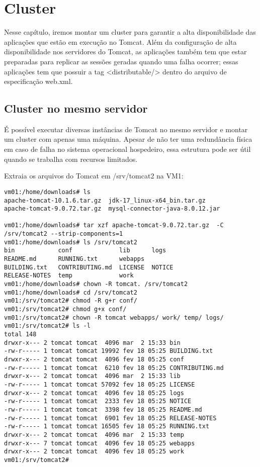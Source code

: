 \section{Cluster}

Nesse capítulo, iremos montar um cluster para garantir a alta disponibilidade das aplicações que estão em execução no Tomcat. Além da configuração de alta disponibilidade nos servidores do Tomcat, as aplicações também tem que estar preparadas para replicar as sessões geradas quando uma falha ocorrer; essas aplicações tem que possuir a tag <distributable/> dentro do arquivo de especificação web.xml.

\subsection{Cluster no mesmo servidor}

É possível executar diversas instâncias de Tomcat no mesmo servidor e montar um cluster com apenas uma máquina. Apesar de não ter uma redundância física em caso de falha no sistema operacional hospedeiro, essa estrutura pode ser útil quando se trabalha com recursos limitados.

Extraia os arquivos do Tomcat em /srv/tomcat2 na VM1:

\begin{lstlisting}[breaklines=true,basicstyle=\firacoderetina,
breaklines=true,caption=\firacoderetina Instalando segunda instância tomcat,
postbreak=\mbox{\textcolor{red}{$\hookrightarrow$}\space},
showstringspaces=false]
vm01:/home/downloads# ls
apache-tomcat-10.1.6.tar.gz  jdk-17_linux-x64_bin.tar.gz
apache-tomcat-9.0.72.tar.gz  mysql-connector-java-8.0.12.jar

vm01:/home/downloads# tar xzf apache-tomcat-9.0.72.tar.gz  -C /srv/tomcat2 --strip-components=1 
vm01:/home/downloads# ls /srv/tomcat2
bin            conf             lib      logs    
README.md      RUNNING.txt      webapps
BUILDING.txt   CONTRIBUTING.md  LICENSE  NOTICE  
RELEASE-NOTES  temp             work
vm01:/home/downloads# chown -R tomcat. /srv/tomcat2 
vm01:/home/downloads# cd /srv/tomcat2
vm01:/srv/tomcat2# chmod -R g+r conf/
vm01:/srv/tomcat2# chmod g+x conf/
vm01:/srv/tomcat2# chown -R tomcat webapps/ work/ temp/ logs/ 
vm01:/srv/tomcat2# ls -l
total 148
drwxr-x--- 2 tomcat tomcat  4096 mar  2 15:33 bin
-rw-r----- 1 tomcat tomcat 19992 fev 18 05:25 BUILDING.txt
drwxr-x--- 2 tomcat tomcat  4096 fev 18 05:25 conf
-rw-r----- 1 tomcat tomcat  6210 fev 18 05:25 CONTRIBUTING.md
drwxr-x--- 2 tomcat tomcat  4096 mar  2 15:33 lib
-rw-r----- 1 tomcat tomcat 57092 fev 18 05:25 LICENSE
drwxr-x--- 2 tomcat tomcat  4096 fev 18 05:25 logs
-rw-r----- 1 tomcat tomcat  2333 fev 18 05:25 NOTICE
-rw-r----- 1 tomcat tomcat  3398 fev 18 05:25 README.md
-rw-r----- 1 tomcat tomcat  6901 fev 18 05:25 RELEASE-NOTES
-rw-r----- 1 tomcat tomcat 16505 fev 18 05:25 RUNNING.txt
drwxr-x--- 2 tomcat tomcat  4096 mar  2 15:33 temp
drwxr-x--- 7 tomcat tomcat  4096 fev 18 05:25 webapps
drwxr-x--- 2 tomcat tomcat  4096 fev 18 05:25 work
vm01:/srv/tomcat2# 

\end{lstlisting}


